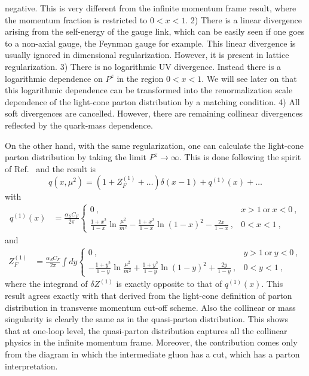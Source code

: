 negative. This is very different from the infinite momentum frame result, where the momentum fraction is restricted to $0<x<1$. 2) There is a linear divergence arising from the self-energy of the gauge link, which can be easily seen if one goes to a non-axial gauge, the Feynman gauge for example. This linear divergence is usually ignored in dimensional regularization. However, it is present in lattice regularization. 3) There
is no logarithmic UV divergence. Instead there is a logarithmic dependence on $P^z$ in the region $0<x<1$. We will see later on that this logarithmic dependence can be transformed into the renormalization scale dependence of the light-cone parton distribution by a matching condition. 4) All soft divergences are cancelled.
However, there are remaining collinear divergences reflected by the quark-mass dependence.

On the other hand, with the same regularization, one can calculate the light-cone parton distribution by taking
the limit $P^z\rightarrow \infty$. This is done following the spirit of Ref.~\cite{Weinberg:1966jm} and the result is
\begin{equation}
                    q(x, \mu^2) = (1+ Z^{(1)}_F+ \dots) \delta(x-1) +  q^{(1)}(x) + \dots
\end{equation}
with
\begin{align}\label{unpolvertexIMF}
q^{(1)}(x)&=\frac{\alpha_S C_F}{2\pi} \left\{ \begin{array} {ll} 0\ , & x>1\  \mbox{or}\  x<0\ , \\ \frac{1+x^2}{1-x}\ln \frac{\mu^2}{m^2}-\frac{1+x^2}{1-x}\ln{(1-x)^2}-\frac{2x}{1-x}\ , & 0<x<1\ ,\end{array} \right.
\end{align}
and
\begin{align}\label{unpolselfIMF}
Z^{(1)}_F &=\frac{\alpha_S C_F}{2\pi} \int dy \left\{ \begin{array} {ll} 0 \ , & y>1 \ \mbox{or} \ y<0\ , \\ -\frac{1+y^2}{1-y}\ln \frac{\mu^2}{m^2}+\frac{1+y^2}{1-y}\ln{(1-y)^2}+\frac{2y}{1-y}\ , & 0<y<1\ , \end{array} \right.
\end{align}
where the integrand of $\delta Z^{(1)}$ is exactly opposite to that of $q^{(1)}(x)$. This result agrees exactly with that derived from the light-cone definition of parton distribution in transverse momentum cut-off scheme. Also the collinear or mass singularity is clearly the
same as in the quasi-parton distribution. This shows that at one-loop level, the quasi-parton distribution captures all the collinear physics
in the infinite momentum frame. Moreover, the contribution comes only from the diagram in which the intermediate gluon has a cut, which has a
parton interpretation.
